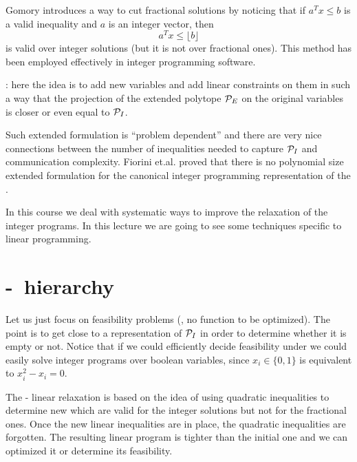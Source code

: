 \documentclass[a4paper,twoside,justified]{tufte-handout}
\begin{document}
 Gomory\cite{gomory1958outline}
introduces a way to cut fractional solutions by noticing that if $
a^{T}x \leq b $ is a valid inequality and $ a $ is an integer vector,
then
\begin{equation}
  a^{T}x \leq \lfloor b \rfloor
\end{equation}
is valid over integer solutions (but it is not over fractional
ones). This method has been employed effectively in integer
programming software.

: here the idea is to add new
variables and add linear constraints on them in such a way that the
projection of the extended polytope $\mathcal{P}_{E}$ on the original
variables is closer or even equal to $ \mathcal{P}_{I} $.

Such extended formulation is ``problem dependent'' and there are very
nice connections between the number of inequalities needed to capture
$ \mathcal{P}_{I} $ and communication complexity. Fiorini
et.al.\cite{fiorini2012linear} proved that there is no polynomial size
extended formulation for the canonical integer programming
representation of the .

In this course we deal with systematic ways to improve the relaxation
of the integer programs. In this lecture we are going to see some
techniques specific to linear programming.

\section{\Lovasz-\Schrijver\ hierarchy}

Let us just focus on feasibility problems (\ie, no function to be
optimized). The point is to get close to a representation of $
\mathcal{P}_{I} $ in order to determine whether it is empty or not. Notice
that if we could efficiently decide feasibility under
 we could easily solve integer
programs over boolean variables, since $ x_{i}\in\{0,1\} $ is
equivalent to $ x^{2}_{i} - x_{i} =0 $.

The \Lovasz-\Schrijver\cite{lovasz1991cones} linear relaxation is
based on the idea of using quadratic inequalities to determine new
 which are valid for the integer
solutions but not for the fractional ones. Once the new linear
inequalities are in place, the quadratic inequalities are forgotten.
The resulting linear program is tighter than the initial one and we
can optimized it or determine its feasibility.
\end{document}
